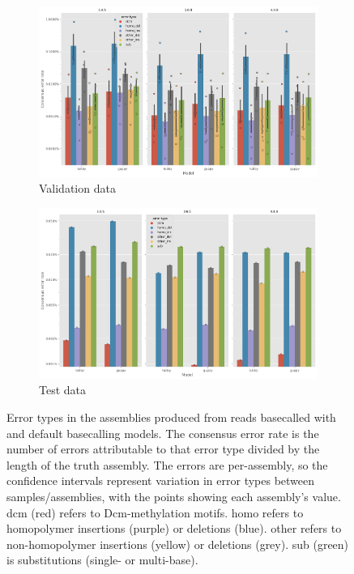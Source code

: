 \begin{figure}
     \centering
     \begin{subfigure}[b]{0.9\textwidth}
        \includegraphics[width=1.0\textwidth]{Chapter4/Figs/eval_error_types.png}
        \centering
        \caption{Validation data}
        \label{fig:eval-error_types}
     \end{subfigure}
     \hfill
     \begin{subfigure}[b]{0.9\textwidth}
         \centering
        \includegraphics[width=1.0\textwidth]{Chapter4/Figs/test_error_types.png}
         \caption{Test data}
         \label{fig:test-error_types}
     \end{subfigure}
        \caption{Error types in the  assemblies produced from reads basecalled with \tubby{} and default \guppy{} basecalling models. The consensus error rate is the number of errors attributable to that error type divided by the length of the truth assembly. The errors are per-assembly, so the confidence intervals represent variation in error types between samples/assemblies, with the points showing each assembly's value. dcm (red) refers to Dcm-methylation motifs. homo refers to homopolymer insertions (purple) or deletions (blue). other refers to non-homopolymer insertions (yellow) or deletions (grey). sub (green) is substitutions (single- or multi-base).}
        \label{fig:error_types}
\end{figure}

